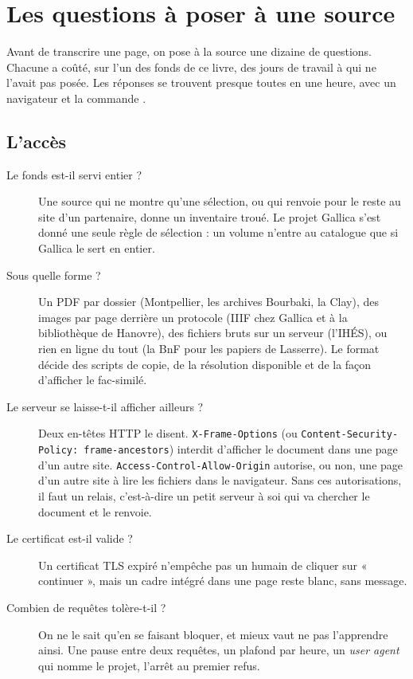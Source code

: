 \chapter{Les questions à poser à une source}\label{ch:grille}

Avant de transcrire une page, on pose à la source une dizaine de questions. Chacune a
coûté, sur l'un des fonds de ce livre, des jours de travail à qui ne l'avait pas posée.
Les réponses se trouvent presque toutes en une heure, avec un navigateur et la commande
.

\section{L'accès}

\begin{description}
  \item[Le fonds est-il servi entier ?] Une source qui ne montre qu'une sélection, ou qui
        renvoie pour le reste au site d'un partenaire, donne un inventaire troué. Le projet
        Gallica s'est donné une seule règle de sélection : un volume n'entre au catalogue
        que si Gallica le sert en entier.
  \item[Sous quelle forme ?] Un PDF par dossier (Montpellier, les archives Bourbaki, la
        Clay), des images par page derrière un protocole (IIIF chez Gallica et à la
        bibliothèque de Hanovre), des fichiers bruts sur un serveur (l'IHÉS), ou rien en
        ligne du tout (la BnF pour les papiers de Lasserre). Le format décide des scripts de
        copie, de la résolution disponible et de la façon d'afficher le fac-similé.
  \item[Le serveur se laisse-t-il afficher ailleurs ?] Deux en-têtes HTTP le disent.
        \texttt{X-Frame-Options} (ou \texttt{Content-Security-Policy: frame-ancestors})
        interdit d'afficher le document dans une page d'un autre site.
        \texttt{Access-Control-Allow-Origin} autorise, ou non, une page d'un autre site à
        lire les fichiers dans le navigateur. Sans ces autorisations, il faut un relais,
        c'est-à-dire un petit serveur à soi qui va chercher le document et le renvoie.
  \item[Le certificat est-il valide ?] Un certificat TLS expiré n'empêche pas un humain de
        cliquer sur « continuer », mais un cadre intégré dans une page reste blanc, sans
        message.
  \item[Combien de requêtes tolère-t-il ?] On ne le sait qu'en se faisant bloquer, et
        mieux vaut ne pas l'apprendre ainsi. Une pause entre deux requêtes, un plafond par
        heure, un \emph{user agent} qui nomme le projet, l'arrêt au premier refus.
\end{description}

